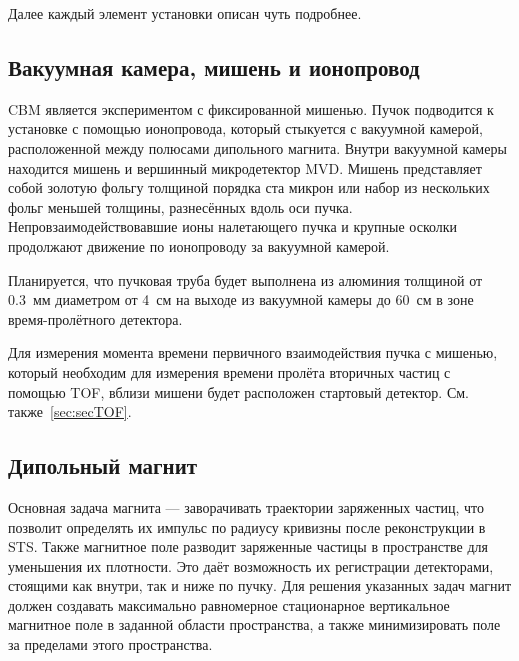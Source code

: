 Далее каждый элемент установки описан чуть подробнее.


\subsection{Вакуумная камера, мишень и ионопровод}\label{sec:secVacChamberPipe}

CBM является экспериментом с фиксированной мишенью. Пучок подводится к установке с помощью ионопровода, который стыкуется с вакуумной камерой, расположенной между полюсами дипольного магнита. Внутри вакуумной камеры находится мишень и вершинный микродетектор MVD. Мишень представляет собой золотую фольгу толщиной порядка ста микрон или набор из нескольких фольг меньшей толщины, разнесённых вдоль оси пучка. Непровзаимодействовавшие ионы налетающего пучка и крупные осколки продолжают движение по ионопроводу за вакуумной камерой.

Планируется, что пучковая труба будет выполнена из алюминия толщиной от 0.3~мм диаметром от 4~см на выходе из вакуумной камеры до 60~см в зоне время-пролётного детектора.

Для измерения момента времени первичного взаимодействия пучка с мишенью, который необходим для измерения времени пролёта вторичных частиц с помощью TOF, вблизи мишени будет расположен стартовый детектор. См. также~\ref{sec:secTOF}.


\subsection{Дипольный магнит}\label{sec:secMagnet}

Основная задача магнита --- заворачивать траектории заряженных частиц, что позволит определять их импульс по радиусу кривизны после реконструкции в STS. Также магнитное поле разводит заряженные частицы в пространстве для уменьшения их плотности. Это даёт возможность их регистрации детекторами, стоящими как внутри, так и ниже по пучку. Для решения указанных задач магнит должен создавать максимально равномерное стационарное вертикальное магнитное поле в заданной области пространства, а также минимизировать поле за пределами этого пространства.


